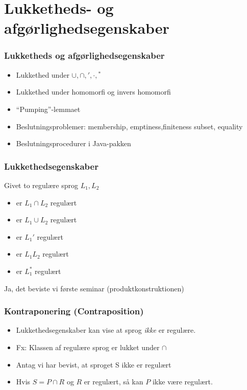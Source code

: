 \section{Lukketheds- og afgørlighedsegenskaber}

\begin{frame}
  \frametitle{Lukketheds og afgørlighedsegenskaber}
  \begin{itemize}
  \item Lukkethed under $\cup, \cap, ', \cdot, {}^*$ 
  \item Lukkethed under homomorfi og invers 
    homomorfi 
  \item ``Pumping''-lemmaet 
  \item Beslutningsproblemer: membership,  
    emptiness,finiteness subset, equality 
  \item Beslutningsprocedurer i Java-pakken
  \end{itemize}
\end{frame}

\begin{frame}
\frametitle{Lukkethedsegenskaber}
Givet to regulære sprog $L_1, L_2$
\begin{itemize}[<+->]
\item er $L_1 \cap L_2$ regulært
\item er $L_1 \cup L_2$ regulært
\item er $L_1'$ regulært
\item er $L_1L_2$ regulært
\item er $L_1^*$ regulært
\end{itemize}
Ja, det beviste vi første seminar (produktkonstruktionen)
\end{frame}

\begin{frame}
\frametitle{Kontraponering (Contraposition)}
\begin{itemize}[<+->]
\item Lukkethedsegenskaber kan vise at sprog \emph{ikke} er regulære.
\item Fx: Klassen af regulære sprog er lukket under $\cap$
\item Antag vi har bevist, at sproget S ikke er  
regulært 
\item Hvis $S = P \cap R$ og $R$ er regulært, så kan  
$P$ ikke være regulært.
\end{itemize}
\end{frame}

